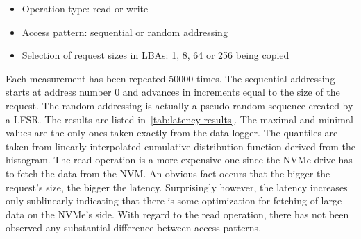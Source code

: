 \begin{itemize}
    \item Operation type: read or write
    \item Access pattern: sequential or random addressing
    \item Selection of request sizes in LBAs: 1, 8, 64 or 256 being copied
\end{itemize}

Each measurement has been repeated 50000 times. The sequential addressing starts at address number 0
and advances in increments equal to the size of the request. The random addressing is actually a
pseudo-random sequence created by a LFSR. The results are listed in~\cref{tab:latency-results}. The
maximal and minimal values are the only ones taken exactly from the data logger. The quantiles are
taken from linearly interpolated cumulative distribution function derived from the histogram. The
read operation is a more expensive one since the NVMe drive has to fetch the data from the \ac{NVM}.
An obvious fact occurs that the bigger the request's size, the bigger the latency. Surprisingly
however, the latency increases only sublinearly indicating that there is some optimization for
fetching of large data on the NVMe's side. With regard to the read operation, there has not been
observed any substantial difference between access patterns.

